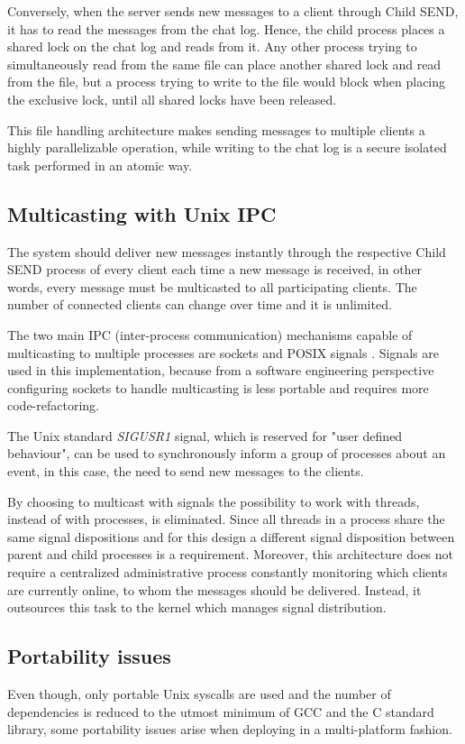 Conversely, when the server sends new messages to a client through Child SEND, it has to read the messages from the chat log. Hence, the child process places a shared lock on the chat log and reads from it. Any other process trying to simultaneously read from the same file can place another shared lock and read from the file, but a process trying to write to the file would block when placing the exclusive lock, until all shared locks have been released. 

This file handling architecture makes sending messages to multiple clients a highly parallelizable operation, while writing to the chat log is a secure isolated task performed in an atomic way.

\subsection{Multicasting with Unix IPC}
The system should deliver new messages instantly through the respective Child SEND process of every client each time a new message is received, in other words, every message must be multicasted to all participating clients. The number of connected clients can change over time and it is unlimited. 

The two main IPC (inter-process communication) mechanisms capable of multicasting to multiple processes are sockets and POSIX signals \cite{Kerrisk2010}. Signals are used in this implementation, because from a software engineering perspective configuring sockets to handle multicasting is less portable and requires more code-refactoring.

The Unix standard \textit{SIGUSR1} signal, which is reserved for "user defined behaviour", can be used to synchronously inform a group of processes about an event, in this case, the need to send new messages to the clients.

By choosing to multicast with signals the possibility to work with threads, instead of with processes, is eliminated. Since all threads in a process share the same signal dispositions and for this design a different signal disposition between parent and child processes is a requirement. Moreover, this architecture does not require a centralized administrative process constantly monitoring which clients are currently online, to whom the messages should be delivered. Instead, it outsources this task to the kernel which manages signal distribution.


\subsection{Portability issues}
Even though, only portable Unix syscalls are used and the number of dependencies is reduced to the utmost minimum of GCC and the C standard library, some portability issues arise when deploying in a multi-platform fashion.

